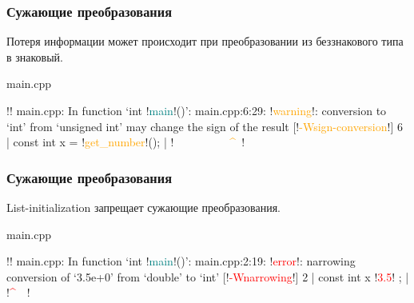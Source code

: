 \documentclass[compress, 8pt]{beamer}
\begin{document}
\begin{frame}[fragile]

    \frametitle{Сужающие преобразования}

    \hfill\break
    Потеря информации может происходит при преобразовании из беззнакового типа
    в знаковый.

        {main.cpp}

    \begin{terminalwindow}
!!
main.cpp: In function ‘int !\textcolor{teal}{main}!()’:
main.cpp:6:29: !\textcolor{orange}{warning}!: conversion to ‘int’ from ‘unsigned int’ may change the sign of the result [!\textcolor{orange}{-Wsign-conversion}!]
    6 |     const int x = !\textcolor{orange}{get\_number}!();
      |                   !\textcolor{orange}{~~~~~~~~~~\^{}~}!
    \end{terminalwindow}

\end{frame}

\begin{frame}[fragile]

    \frametitle{Сужающие преобразования}

    List-initialization запрещает сужающие преобразования.

        {main.cpp}

    \begin{terminalwindow}
!!
main.cpp: In function ‘int !\textcolor{teal}{main}!()’:
main.cpp:2:19: !\textcolor{red}{error}!: narrowing conversion of ‘3.5e+0’ from ‘double’ to ‘int’ [!\textcolor{red}{-Wnarrowing}!]
    2 |     const int x { !\textcolor{red}{3.5}! };
      |                   !\textcolor{red}{\^{}~~}!
    \end{terminalwindow}

\end{frame}
\end{document}
